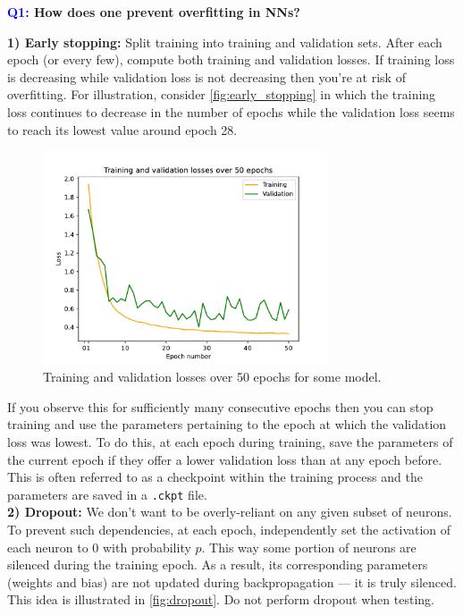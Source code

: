 \documentclass[11pt]{article}
\begin{document}
\begin{center}
    \textbf{\textcolor{blue}{Q1:} How does one prevent overfitting in NNs?}
\end{center}
\textbf{1) Early stopping:} Split training into training and validation sets. After each epoch (or every few), compute both training and validation losses. If training loss is decreasing while validation loss is not decreasing then you're at risk of overfitting. For illustration, consider \autoref{fig:early_stopping} in which the training loss continues to decrease in the number of epochs while the validation loss seems to reach its lowest value around epoch 28.

\begin{figure}
    \centering
    \includegraphics[width=0.75\textwidth]{./figures/neural_nets/REG_early_stopping.pdf}
    \caption{Training and validation losses over 50 epochs for some model.}
    \label{fig:early_stopping}
\end{figure}

\noindent If you observe this for sufficiently many consecutive epochs then you can stop training and use the parameters pertaining to the epoch at which the validation loss was lowest. To do this, at each epoch during training, save the parameters of the current epoch if they offer a lower validation loss than at any epoch before. This is often referred to as a checkpoint within the training process and the parameters are saved in a \texttt{.ckpt} file.\\

\noindent\textbf{2) Dropout:} We don't want to be overly-reliant on any given subset of neurons. To prevent such dependencies, at each epoch, independently set the activation of each neuron to 0 with probability $p$. This way some portion of neurons are silenced during the training epoch. As a result, its corresponding parameters (weights and bias) are not updated during backpropagation — it is truly silenced. This idea is illustrated in \autoref{fig:dropout}. Do not perform dropout when testing.
\end{document}
